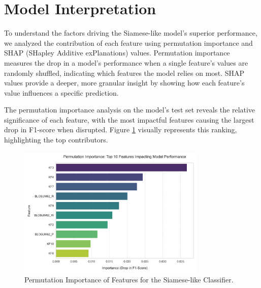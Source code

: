 \documentclass{article}
\begin{document}
\begin{table}[h!]
\centering
{}
\caption{Comparative Summary of Model Performance on Test Set}
\label{tab:all_model_performance}
\end{table}

\section{Model Interpretation}
To understand the factors driving the Siamese-like model's superior performance, we analyzed the contribution of each feature using permutation importance \cite{Breiman2001RandomForests} and SHAP \cite{Lundberg2017SHAP} (SHapley Additive exPlanations) values. Permutation importance measures the drop in a model's performance when a single feature's values are randomly shuffled, indicating which features the model relies on most. SHAP values provide a deeper, more granular insight by showing how each feature's value influences a specific prediction.

The permutation importance analysis on the model's test set reveals the relative significance of each feature, with the most impactful features causing the largest drop in F1-score when disrupted. Figure \ref{fig:permutation_importance} visually represents this ranking, highlighting the top contributors.

\begin{figure}[h!]
\centering
\includegraphics[width=0.8\textwidth]{images/12.png}
\caption{Permutation Importance of Features for the Siamese-like Classifier.}
\label{fig:permutation_importance}
\end{figure}
\end{document}

